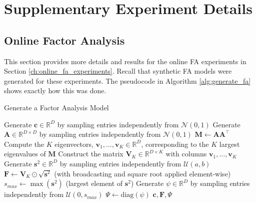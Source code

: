 \documentclass[msc,deptreport.inf]{infthesis} %
\newcommand{\matr}[1]{\mathbf{#1}}
\newcommand{\R}{\mathbb R}
\begin{document}
 \chapter{Supplementary Experiment Details}
 
 \section{Online Factor Analysis}\label{app:online_fa}
 
This section provides more details and results for the online FA experiments in Section \ref{ch:online_fa_experiments}. Recall that synthetic FA models were generated for these experiments. The pseudocode in Algorithm \ref{alg:generate_fa} shows exactly how this was done.
  \begin{algorithm}[!htbp] 
	\caption{Generate a Factor Analysis Model}
	\label{alg:generate_fa}
	\begin{algorithmic}[1]
		\State Generate $\matr{c} \in \R^D$ by sampling entries independently from $\mathcal{N}(0, 1)$
		\State Generate $\matr{A} \in \R^{D \times D}$ by sampling entries independently from $\mathcal{N}(0, 1)$
		\State $\matr{M} \leftarrow \matr{A} \matr{A}^\intercal$
		\State Compute the $K$ eigenvectors, $\matr{v}_1, \dots, \matr{v}_K \in \R^D$, corresponding to the $K$ largest eigenvalues of $\matr{M}$
		\State Construct the matrix $\matr{V}_K \in \R^{D \times K}$ with columns $\matr{v}_1, \dots, \matr{v}_K$
		\State Generate $\matr{s}^2 \in \R^D$ by sampling entries independently from $\mathcal{U}(a, b)$
		\State $\matr{F} \leftarrow \matr{V}_K \odot \sqrt{\matr{s}^2}$ (with broadcasting and square root applied element-wise)
		\State $s_{max} \leftarrow \max({\matr{s}^2})$ (largest element of ${\matr{s}^2}$)
		\State Generate $\psi \in \R^D$ by sampling entries independently from $\mathcal{U}(0, s_{max}) $
		\State $\Psi \leftarrow \text{diag}(\psi)$
		\State \Return $\matr{c}, \matr{F}, \Psi$	
	\end{algorithmic}
\end{algorithm}
\end{document}
